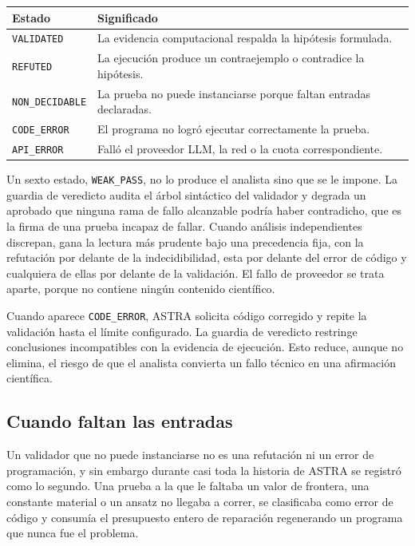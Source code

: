 \documentclass[11pt,a4paper]{article}
\begin{document}
\begin{center}
\begin{tabular}{@{}ll@{}}
\toprule
Estado & Significado \\
\midrule
\texttt{VALIDATED} & La evidencia computacional respalda la hipótesis formulada. \\
\texttt{REFUTED} & La ejecución produce un contraejemplo o contradice la hipótesis. \\
\texttt{NON\_DECIDABLE} & La prueba no puede instanciarse porque faltan entradas declaradas. \\
\texttt{CODE\_ERROR} & El programa no logró ejecutar correctamente la prueba. \\
\texttt{API\_ERROR} & Falló el proveedor LLM, la red o la cuota correspondiente. \\
\bottomrule
\end{tabular}
\end{center}

Un sexto estado, \texttt{WEAK\_PASS}, no lo produce el analista sino que se le impone. La guardia de veredicto audita el árbol sintáctico del validador y degrada un aprobado que ninguna rama de fallo alcanzable podría haber contradicho, que es la firma de una prueba incapaz de fallar. Cuando análisis independientes discrepan, gana la lectura más prudente bajo una precedencia fija, con la refutación por delante de la indecidibilidad, esta por delante del error de código y cualquiera de ellas por delante de la validación. El fallo de proveedor se trata aparte, porque no contiene ningún contenido científico.

Cuando aparece \texttt{CODE\_ERROR}, ASTRA solicita código corregido y repite la validación hasta el límite configurado. La guardia de veredicto restringe conclusiones incompatibles con la evidencia de ejecución. Esto reduce, aunque no elimina, el riesgo de que el analista convierta un fallo técnico en una afirmación científica.

\subsection{Cuando faltan las entradas}

Un validador que no puede instanciarse no es una refutación ni un error de programación, y sin embargo durante casi toda la historia de ASTRA se registró como lo segundo. Una prueba a la que le faltaba un valor de frontera, una constante material o un ansatz no llegaba a correr, se clasificaba como error de código y consumía el presupuesto entero de reparación regenerando un programa que nunca fue el problema.
\end{document}
